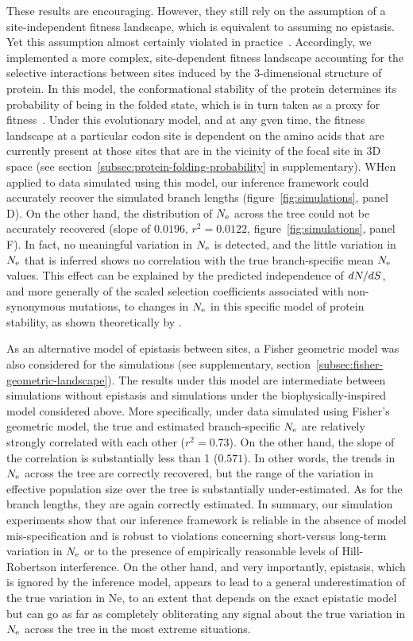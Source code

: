 These results are encouraging.
However, they still rely on the assumption of a site-independent fitness landscape, which is equivalent to assuming no epistasis.
Yet this assumption almost certainly violated in practice~\citep{Pollock2014,Shah2015}.
Accordingly, we implemented a more complex, site-dependent fitness landscape accounting for the selective interactions between sites induced by the 3-dimensional structure of protein.
In this model, the conformational stability of the protein determines its probability of being in the folded state, which is in turn taken as a proxy for fitness~\citep{Williams2006, Goldstein2011, Pollock2012}.
Under this evolutionary model, and at any gven time, the fitness landscape at a particular \gls{codon} site is dependent on the amino acids that are currently present at those sites that are in the vicinity of the focal site in 3D space (see section~\ref{subsec:protein-folding-probability} in supplementary).
WHen applied to data simulated using this model, our inference framework could accurately recover the simulated branch lengths (figure~\ref{fig:simulations}, panel D).
On the other hand, the distribution of $N_{\text{e}}$ across the tree could not be accurately recovered (slope of $0.0196$, $r^2 = 0.0122$, figure~\ref{fig:simulations}, panel F).
In fact, no meaningful variation in $N_{\text{e}}$ is detected, and the little variation in $N_{\text{e}}$ that is inferred shows no correlation with the true branch-specific mean $N_{\text{e}}$ values.
This effect can be explained by the predicted independence of $dN/dS$, and more generally of the scaled selection coefficients associated with \gls{non-synonymous} mutations, to changes in $N_{\text{e}}$ in this specific model of protein stability, as shown theoretically by \citet{Goldstein2013}.

As an alternative model of epistasis between sites, a Fisher geometric model was also considered for the simulations (see supplementary, section~\ref{subsec:fisher-geometric-landscape}).
The results under this model are intermediate between simulations without epistasis and simulations under the biophysically-inspired model considered above.
More specifically, under data simulated using Fisher’s geometric model, the true and estimated branch-specific $N_{\text{e}}$ are relatively strongly correlated with each other ($r^2 = 0.73$).
On the other hand, the slope of the correlation is substantially less than 1 ($0.571$).
In other words, the trends in $N_{\text{e}}$ across the tree are correctly recovered, but the range of the variation in \gls{effective population size} over the tree is substantially under-estimated.
As for the branch lengths, they are again correctly estimated.
In summary, our simulation experiments show that our inference framework is reliable in the absence of model mis-specification and is robust to violations concerning short-versus long-term variation in $N_{\text{e}}$ or to the presence of empirically reasonable levels of Hill-Robertson interference.
On the other hand, and very importantly, epistasis, which is ignored by the inference model, appears to lead to a general underestimation of the true variation in Ne, to an extent that depends on the exact epistatic model but can go as far as completely obliterating any signal about the true variation in $N_{\text{e}}$ across the tree in the most extreme situations.


